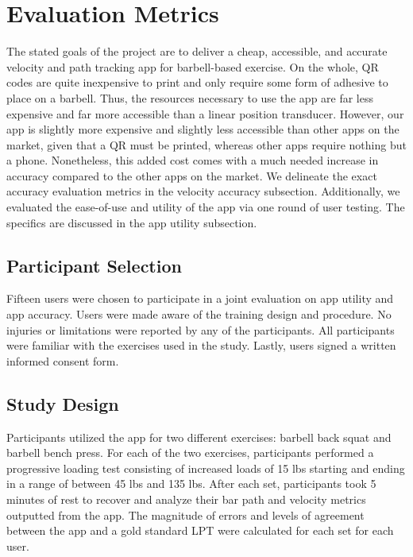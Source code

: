 \documentclass[10pt,twocolumn]{article}
\begin{document}
\section{Evaluation Metrics}
The stated goals of the project are to deliver a cheap, accessible, and accurate velocity and path tracking app for barbell-based exercise.
On the whole, QR codes are quite inexpensive to print and only require some form of adhesive to place on a barbell.
Thus, the resources necessary to use the app are far less expensive and far more accessible than a linear position transducer.
However, our app is slightly more expensive and slightly less accessible than other apps on the market, given that a QR must be printed, whereas other apps require nothing but a phone.
Nonetheless, this added cost comes with a much needed increase in accuracy compared to the other apps on the market.
We delineate the exact accuracy evaluation metrics in the velocity accuracy subsection.
Additionally, we evaluated the ease-of-use and utility of the app via one round of user testing.
The specifics are discussed in the app utility subsection.
\par

\subsection{Participant Selection}
Fifteen users were chosen to participate in a joint evaluation on app utility and app accuracy.
Users were made aware of the training design and procedure.
No injuries or limitations were reported by any of the participants.
All participants were familiar with the exercises used in the study.
Lastly, users signed a written informed consent form. \par

\subsection{Study Design}
Participants utilized the app for two different exercises: barbell back squat and barbell bench press.
For each of the two exercises, participants performed a progressive loading test consisting of increased loads of 15 lbs starting and ending in a range of between 45 lbs and 135 lbs. 
After each set, participants took 5 minutes of rest to recover and analyze their bar path and velocity metrics outputted from the app.
The magnitude of errors and levels of agreement between the app and a gold standard LPT were calculated for each set for each user. \par
\end{document}
